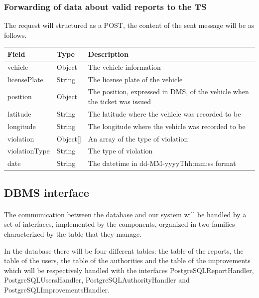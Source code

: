 					\subsubsection{Forwarding of data about valid reports to the TS}
						The request will structured as a POST, the content of the sent message will be as follows.
						\begin{table}[!h]
						\begin{tabular}{L{0.25\textwidth}L{0.1\textwidth}L{0.45\textwidth}}
							\toprule
							Field & Type & Description \\
							\midrule
							vehicle & Object & The vehicle information \\
							\hspace{2.5mm}licensePlate & String & The license plate of the vehicle \\
							position & Object & The position, expressed in DMS, of the vehicle when the ticket was issued  \\
							\hspace{2.5mm}latitude & String & The latitude where the vehicle was recorded to be \\
							\hspace{2.5mm}longitude & String & The longitude where the vehicle was recorded to be \\
							violation & Object[] & An array of the type of violation \\
							\hspace{2.5mm}violationType & String & The type of violation \\
							date & String & The datetime in \newline dd-MM-yyyyThh:mm:ss format \\
								 	\bottomrule
								\end{tabular}
							\end{table}
			\subsection{DBMS interface}
				\paragraph{}
					The communication between the database and our system will be handled by a set of interfaces, implemented by the components, organized in two families characterized by the table that they manage. 
					
					In the database there will be four different tables: the table of the reports, the table of the users, the table of the authorities and the table of the improvements which will be respectively handled with the interfaces PostgreSQLReportHandler, PostgreSQLUsersHandler, PostgreSQLAuthorityHandler and PostgreSQLImprovementsHandler.
